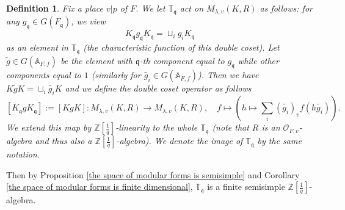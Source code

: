 \documentclass[12pt,oneside,reqno]{amsart}
\theoremstyle{plain}
\newtheorem{definition}[theorem]{Definition}
\begin{document}
	
	\begin{definition}\label{unramified Hecke operators}
		Fix a place $v|p$ of $F$.
		We let
		$\mathbb{T}_\mathfrak{q}$
		act on
		$M_{\lambda,v}(K,R)$
		as follows: for any $g_{\mathfrak{q}}\in G(F_{\mathfrak{q}})$, we view
		\[
		K_\mathfrak{q}g_\mathfrak{q}K_\mathfrak{q}
		=
		\sqcup_ig_iK_\mathfrak{q}
		\]
		as an element in
		$\mathbb{T}_\mathfrak{q}$
		(the characteristic function of this double coset).
		Let
		$\widetilde{g}\in
		G(\mathbb{A}_{F,f})$
		be the element with $\mathfrak{q}$-th component equal to
		$g_\mathfrak{q}$
		while
		other components equal to $1$
		(similarly for $\widetilde{g_i}\in G(\mathbb{A}_{F,f})$).
		Then we have
		$K\widetilde{g}K
		=
		\sqcup_i\widetilde{g_i}K$
		and we define the double coset operator as follows
		\[
		[K_\mathfrak{q}gK_\mathfrak{q}]
		:=
		[KgK]
		\colon
		M_{\lambda,v}(K,R)
		\rightarrow
		M_{\lambda,v}(K,R),
		\quad
		f\mapsto
		(
		h\mapsto
		\sum_i(\widetilde{g_i})_v
		f(h\widetilde{g_i})
		).
		\]
		We extend
		this map by
		$\mathbb{Z}[\frac{1}{q}]$-linearity to the whole
		$\mathbb{T}_\mathfrak{q}$
		(note that $R$ is an
		$\mathcal{O}_{F,v}$-algebra and thus also a
		$\mathbb{Z}[\frac{1}{q}]$-algebra).
		We denote the image of
		$\mathbb{T}_\mathfrak{q}$
		by the same notation.
	\end{definition}
	Then by
	Proposition
	\ref{the space of modular forms is semisimple}
	and
	Corollary
	\ref{the space of modular forms is finite dimensional},
	$\mathbb{T}_\mathfrak{q}$
	is a finite semisimple
	$\mathbb{Z}[\frac{1}{q}]$-algebra.
	
	
	
	
	
	
\end{document}
